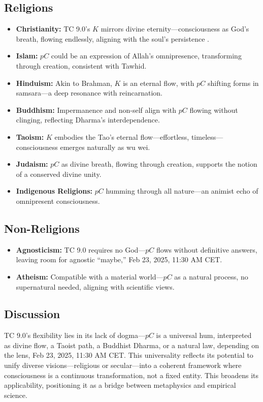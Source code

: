 \documentclass[11pt]{article}
\begin{document}
\subsection{Religions}
\begin{itemize}
    \item \textbf{Christianity:} TC 9.0’s $K$ mirrors divine eternity—consciousness as God’s breath, flowing endlessly, aligning with the soul’s persistence \citep{tononi2008consciousness}.
    \item \textbf{Islam:} $pC$ could be an expression of Allah’s omnipresence, transforming through creation, consistent with Tawhid.
    \item \textbf{Hinduism:} Akin to Brahman, $K$ is an eternal flow, with $pC$ shifting forms in samsara—a deep resonance with reincarnation.
    \item \textbf{Buddhism:} Impermanence and non-self align with $pC$ flowing without clinging, reflecting Dharma’s interdependence.
    \item \textbf{Taoism:} $K$ embodies the Tao’s eternal flow—effortless, timeless—consciousness emerges naturally as wu wei.
    \item \textbf{Judaism:} $pC$ as divine breath, flowing through creation, supports the notion of a conserved divine unity.
    \item \textbf{Indigenous Religions:} $pC$ humming through all nature—an animist echo of omnipresent consciousness.
\end{itemize}

\subsection{Non-Religions}
\begin{itemize}
    \item \textbf{Agnosticism:} TC 9.0 requires no God—$pC$ flows without definitive answers, leaving room for agnostic “maybe,” Feb 23, 2025, 11:30 AM CET.
    \item \textbf{Atheism:} Compatible with a material world—$pC$ as a natural process, no supernatural needed, aligning with scientific views.
\end{itemize}

\subsection{Discussion}
TC 9.0’s flexibility lies in its lack of dogma—$pC$ is a universal hum, interpreted as divine flow, a Taoist path, a Buddhist Dharma, or a natural law, depending on the lens, Feb 23, 2025, 11:30 AM CET. This universality reflects its potential to unify diverse visions—religious or secular—into a coherent framework where consciousness is a continuous transformation, not a fixed entity. This broadens its applicability, positioning it as a bridge between metaphysics and empirical science.
\end{document}
